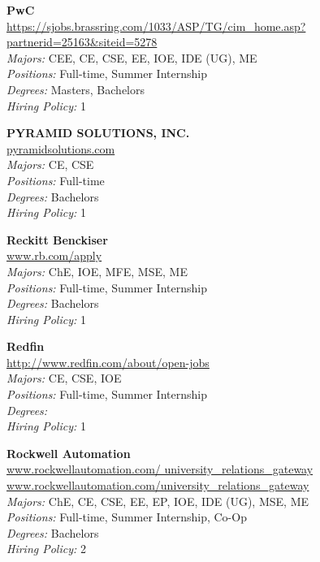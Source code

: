\documentclass[twoside]{article}
\begin{document}
\begin{center}
\begin{multicols}{3}
\begin{minipage}{.9\columnwidth}{\Large\bf PwC }\\
	\url{https://sjobs.brassring.com/1033/ASP/TG/cim_home.asp?partnerid=25163&siteid=5278}\\
	\emph{Majors:} CEE, CE, CSE, EE, IOE, IDE (UG), ME\\
	\emph{Positions:} Full-time, Summer Internship\\
	\emph{Degrees:} Masters, Bachelors\\
	\emph{Hiring Policy:} 1\\
\end{minipage}
 
\begin{minipage}{.9\columnwidth}{\Large\bf PYRAMID SOLUTIONS, INC. }\\
	\url{pyramidsolutions.com}\\
	\emph{Majors:} CE, CSE\\
	\emph{Positions:} Full-time\\
	\emph{Degrees:} Bachelors\\
	\emph{Hiring Policy:} 1\\
\end{minipage}
 
\begin{minipage}{.9\columnwidth}{\Large\bf Reckitt Benckiser }\\
	\url{www.rb.com/apply}\\
	\emph{Majors:} ChE, IOE, MFE, MSE, ME\\
	\emph{Positions:} Full-time, Summer Internship\\
	\emph{Degrees:} Bachelors\\
	\emph{Hiring Policy:} 1\\
\end{minipage}
 
\begin{minipage}{.9\columnwidth}{\Large\bf Redfin }\\
	\url{http://www.redfin.com/about/open-jobs}\\
	\emph{Majors:} CE, CSE, IOE\\
	\emph{Positions:} Full-time, Summer Internship\\
	\emph{Degrees:} \\
	\emph{Hiring Policy:} 1\\
\end{minipage}
 
\begin{minipage}{.9\columnwidth}{\Large\bf Rockwell Automation }\\
	\url{www.rockwellautomation.com/ university_relations_gateway www.rockwellautomation.com/university_relations_gateway}\\
	\emph{Majors:} ChE, CE, CSE, EE, EP, IOE, IDE (UG), MSE, ME\\
	\emph{Positions:} Full-time, Summer Internship, Co-Op\\
	\emph{Degrees:} Bachelors\\
	\emph{Hiring Policy:} 2\\
\end{minipage}
 

\end{multicols}
\end{center}
\end{document}

